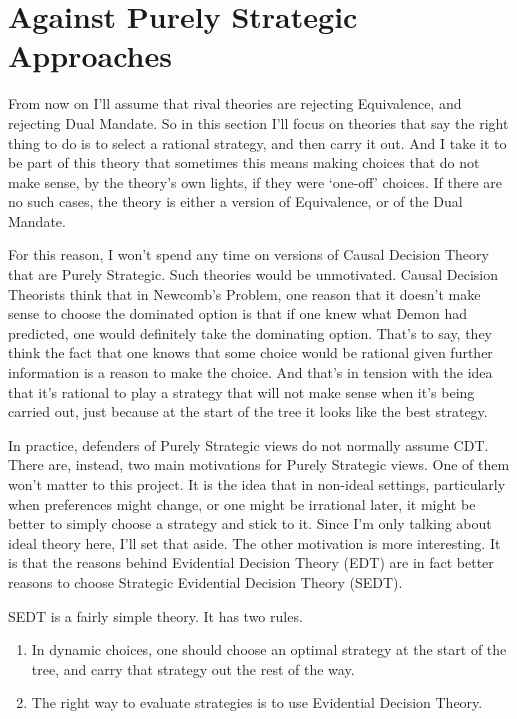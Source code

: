 \documentclass[
  12pt,
  letterpaper,
  DIV=11,
  numbers=noendperiod]{scrreprt}
\providecommand{\tightlist}{%
  \setlength{\itemsep}{0pt}\setlength{\parskip}{0pt}}\usepackage{longtable,booktabs,array}
\begin{document}
\section{Against Purely Strategic
Approaches}\label{sec-against-pure-strategy}

From now on I'll assume that rival theories are rejecting Equivalence,
and rejecting Dual Mandate. So in this section I'll focus on theories
that say the right thing to do is to select a rational strategy, and
then carry it out. And I take it to be part of this theory that
sometimes this means making choices that do not make sense, by the
theory's own lights, if they were `one-off' choices. If there are no
such cases, the theory is either a version of Equivalence, or of the
Dual Mandate.

For this reason, I won't spend any time on versions of Causal Decision
Theory that are Purely Strategic. Such theories would be unmotivated.
Causal Decision Theorists think that in Newcomb's Problem, one reason
that it doesn't make sense to choose the dominated option is that if one
knew what Demon had predicted, one would definitely take the dominating
option. That's to say, they think the fact that one knows that some
choice would be rational given further information is a reason to make
the choice. And that's in tension with the idea that it's rational to
play a strategy that will not make sense when it's being carried out,
just because at the start of the tree it looks like the best strategy.

In practice, defenders of Purely Strategic views do not normally assume
CDT. There are, instead, two main motivations for Purely Strategic
views. One of them won't matter to this project. It is the idea that in
non-ideal settings, particularly when preferences might change, or one
might be irrational later, it might be better to simply choose a
strategy and stick to it. Since I'm only talking about ideal theory
here, I'll set that aside. The other motivation is more interesting. It
is that the reasons behind Evidential Decision Theory (EDT) are in fact
better reasons to choose Strategic Evidential Decision Theory (SEDT).

SEDT is a fairly simple theory. It has two rules.

\begin{enumerate}
\def\labelenumi{\arabic{enumi}.}
\tightlist
\item
  In dynamic choices, one should choose an optimal strategy at the start
  of the tree, and carry that strategy out the rest of the way.
\item
  The right way to evaluate strategies is to use Evidential Decision
  Theory.
\end{enumerate}
\end{document}
